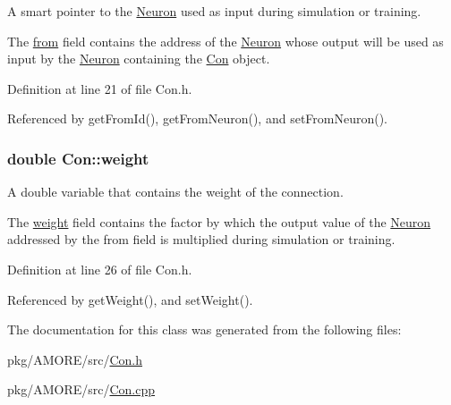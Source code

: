 A smart pointer to the \hyperlink{class_neuron}{Neuron} used as input during simulation or training. 

The \hyperlink{class_con_a7c05f90dff56fd26c1fa0f042bba67a6}{from} field contains the address of the \hyperlink{class_neuron}{Neuron} whose output will be used as input by the \hyperlink{class_neuron}{Neuron} containing the \hyperlink{class_con}{Con} object. 

Definition at line 21 of file Con.h.



Referenced by getFromId(), getFromNeuron(), and setFromNeuron().

\hypertarget{class_con_a7f46485ba5b41971ea38641f9e7d1be0}{
\subsubsection[{weight}]{\setlength{\rightskip}{0pt plus 5cm}double {\bf Con::weight}}}
\label{class_con_a7f46485ba5b41971ea38641f9e7d1be0}


A double variable that contains the weight of the connection. 

The \hyperlink{class_con_a7f46485ba5b41971ea38641f9e7d1be0}{weight} field contains the factor by which the output value of the \hyperlink{class_neuron}{Neuron} addressed by the from field is multiplied during simulation or training. 

Definition at line 26 of file Con.h.



Referenced by getWeight(), and setWeight().



The documentation for this class was generated from the following files:\begin{DoxyCompactItemize}
\item 
pkg/AMORE/src/\hyperlink{_con_8h}{Con.h}\item 
pkg/AMORE/src/\hyperlink{_con_8cpp}{Con.cpp}\end{DoxyCompactItemize}
